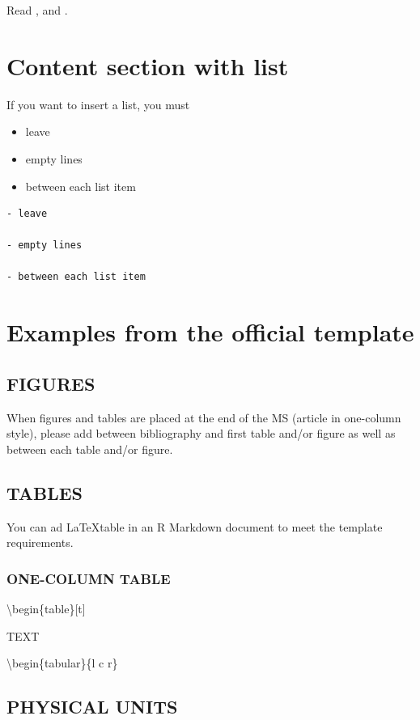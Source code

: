 \documentclass[gc, manuscript]{copernicus}
\begin{document}
Read \citep{Evans_QSR13}, and \citep[see][]{PRYSM}.

\section{Content section with list}

If you want to insert a list, you must

\begin{itemize}
\item
  leave
\item
  empty lines
\item
  between each list item
\end{itemize}

\begin{verbatim}
- leave

- empty lines

- between each list item
\end{verbatim}

\section{Examples from the official template}

\subsection{FIGURES}

When figures and tables are placed at the end of the MS (article in
one-column style), please add \clearpage between bibliography and first
table and/or figure as well as between each table and/or figure.

\subsection{TABLES}

You can ad \LaTeX table in an R Markdown document to meet the template
requirements.

\subsubsection{ONE-COLUMN TABLE}

\textbackslash{}begin\{table\}{[}t{]} \caption{TEXT}
\textbackslash{}begin\{tabular\}\{l c r\} \tophline

\subsection{PHYSICAL UNITS}
\end{document}
